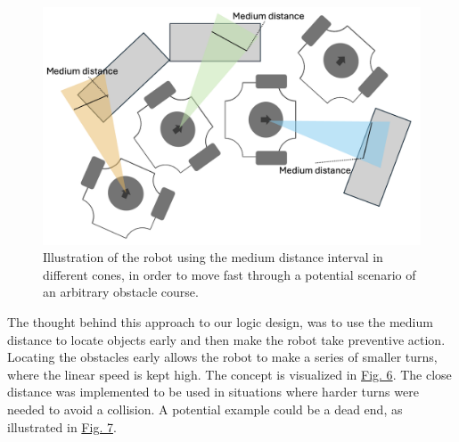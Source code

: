 \documentclass[conference]{IEEEtran}
\begin{document}
    \begin{figure}[b]
        \centerline{\includegraphics[width=1.0\columnwidth]{Pictures/Medium Distance Aviodance.png}}
        \caption{Illustration of the robot using the medium distance interval in different cones, in order to move fast through a potential scenario of an arbitrary obstacle course.}
        \label{sec:medium aviodance}
        \end{figure}
The thought behind this approach to our logic design, was to use the medium distance to locate objects early and then make the robot take preventive action.
Locating the obstacles early allows the robot to make a series of smaller turns, where the linear speed is kept high. The concept is visualized in \href{sec:medium aviodance}{Fig. 6}.
The close distance was implemented to be used in situations where harder turns were needed to avoid a collision. A potential example could be a dead end, as illustrated in \href{sec:close aviodance}{Fig. 7}.
\end{document}
